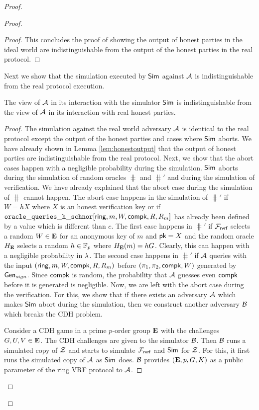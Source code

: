 \begin{proof}
\begin{proof}
\begin{proof}
			This concludes the proof of showing the output of honest parties in the ideal world are indistinguishable from the output of the honest parties in the real protocol.
		\end{proof}	
		
		Next we show that the simulation executed by $ \mathsf{Sim} $ against $ \mathcal{A} $ is indistinguishable from the real protocol execution.
		
		\begin{lemma} 
			The view of $ \mathcal{A} $ in its interaction with the simulator $ \mathsf{Sim} $ is indistinguishable from the view of $ \mathcal{A} $ in its interaction with real honest parties.
		\end{lemma}
		
		
		\begin{proof}
			The  simulation against the real world adversary $ \mathcal{A} $ is identical to the real protocol except the output of the honest parties and cases where $ \mathsf{Sim} $ aborts. We have already shown in Lemma \ref{lem:honestoutput} that the output of honest parties are indistinguishable from the real protocol. Next, we show that the abort cases happen with a negligible probability during the simulation. $ \mathsf{Sim} $ aborts during the simulation of random oracles $ \hash $ and $ \hash' $ and during the simulation of verification. We have already explained that the abort case during the simulation of $ \hash $ cannot happen. The abort case happens in the simulation of $ \hash' $ if $ W = hX $ where $ X $ is an honest verification key or if $ \mathtt{oracle\_queries\_h\_schnor}[\mathsf{ring},m,W,\mathsf{compk},R,R_m] $ has already been defined by a value which is different than $ c $. The first case happens in $ \hash' $ if $ \mathcal{F}_{\textsf{rvrf}} $ selects a random $ W \in {\mathbf{E}}$ for an anonymous key of $ m $ and $ \mathsf{pk} = X $ and the random oracle $ H_{\mathbf{E}} $ selects a random $ h \in \mathbb{F}_p  $ where $ H_{\mathbf{E}}(m) = hG $. Clearly, this can happen with a negligible probability in $ \lambda $. The 
			second case happens in $ \hash' $ if $ \mathcal{A} $ queries with the input $ (\mathsf{ring},m,W,\mathsf{compk},R,R_m) $ before $ (\pi_1,\pi_2,\mathsf{compk},W) $ generated by $ \mathsf{Gen}_{sign} $. Since $ \mathsf{compk} $ is random, the probability that $ \mathcal{A} $ guesses even $ \mathsf{compk} $ before it is generated is negligible.
			Now, we are left with the abort case during the verification.
			For this, we show that if there exists an adversary $ \mathcal{A} $ which makes $ \mathsf{Sim} $ abort during the simulation, then we construct another adversary $ \mathcal{B} $ which breaks the CDH problem. 
			
			Consider a CDH game in a prime $ p $-order group  $ {\mathbf{E}} $ with the challenges $ G,U, V \in {\mathbf{E}}$. The CDH challenges are given to the simulator $ \mathcal{B} $. Then $ \mathcal{B} $ runs a simulated copy of $ \mathcal{Z} $ and starts to simulate $ \mathcal{F}_{\textsf{rvrf}} $ and $ \mathsf{Sim} $ for $ \mathcal{Z} $. For this, it first runs the simulated copy of $ \mathcal{A} $ as $ \mathsf{Sim} $ does. $ \mathcal{B} $ provides $ ({\mathbf{E}}, p, G , K) $ as a public parameter of the ring VRF protocol to $ \mathcal{A} $.
			

\end{proof}
\end{proof}
\end{proof}
